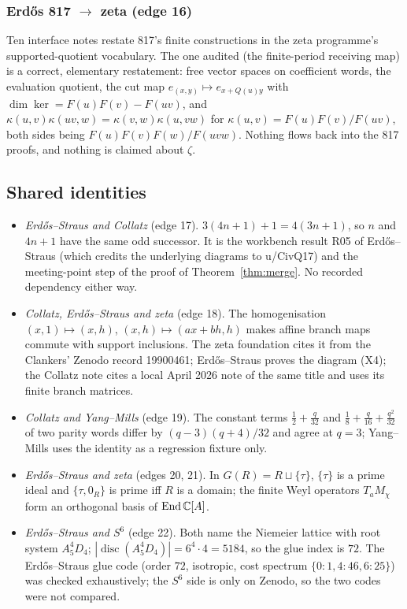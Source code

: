 \subsubsection{Erdős 817 \texorpdfstring{$\to$}{to} zeta (edge 16)}
Ten interface notes restate 817's finite constructions in the zeta programme's supported-quotient vocabulary. The one audited (the finite-period receiving map) is a correct, elementary restatement: free vector spaces on coefficient words, the evaluation quotient, the cut map $e_{(x,y)}\mapsto e_{x+Q(u)y}$ with $\dim\ker=F(u)F(v)-F(uv)$, and $\kappa(u,v)\kappa(uv,w)=\kappa(v,w)\kappa(u,vw)$ for $\kappa(u,v)=F(u)F(v)/F(uv)$, both sides being $F(u)F(v)F(w)/F(uvw)$. Nothing flows back into the 817 proofs, and nothing is claimed about $\zeta$.

\subsection{Shared identities}

\begin{itemize}
\item \emph{Erdős--Straus and Collatz} (edge 17). $3(4n+1)+1=4(3n+1)$, so $n$ and $4n+1$ have the same odd successor. It is the workbench result R05 of Erdős--Straus (which credits the underlying diagrams to u/CivQ17) and the meeting-point step of the proof of Theorem~\ref{thm:merge}. No recorded dependency either way.
\item \emph{Collatz, Erdős--Straus and zeta} (edge 18). The homogenisation $(x,1)\mapsto(x,h)$, $(x,h)\mapsto(ax+bh,h)$ makes affine branch maps commute with support inclusions. The zeta foundation cites it from the Clankers' Zenodo record 19900461; Erdős--Straus proves the diagram (X4); the Collatz note cites a local April 2026 note of the same title and uses its finite branch matrices.
\item \emph{Collatz and Yang--Mills} (edge 19). The constant terms $\frac12+\frac q{32}$ and $\frac18+\frac q{16}+\frac{q^2}{32}$ of two parity words differ by $(q-3)(q+4)/32$ and agree at $q=3$; Yang--Mills uses the identity as a regression fixture only.
\item \emph{Erdős--Straus and zeta} (edges 20, 21). In $G(R)=R\sqcup\{\tau\}$, $\{\tau\}$ is a prime ideal and $\{\tau,0_R\}$ is prime iff $R$ is a domain; the finite Weyl operators $T_aM_\chi$ form an orthogonal basis of $\operatorname{End}\mathbb{C}[A]$.
\item \emph{Erdős--Straus and $S^6$} (edge 22). Both name the Niemeier lattice with root system $A_5^4D_4$; $|\operatorname{disc}(A_5^4D_4)|=6^4\cdot4=5184$, so the glue index is $72$. The Erdős--Straus glue code (order $72$, isotropic, cost spectrum $\{0:1,4:46,6:25\}$) was checked exhaustively; the $S^6$ side is only on Zenodo, so the two codes were not compared.
\end{itemize}

